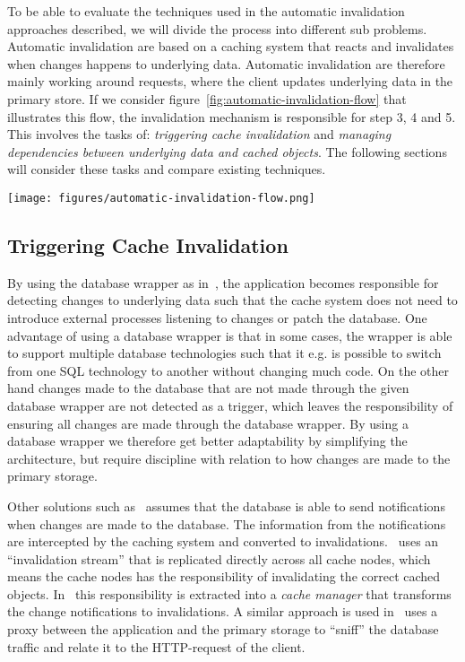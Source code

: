 To be able to evaluate the techniques used in the automatic invalidation approaches described, we will divide the process into different sub problems. Automatic invalidation are based on a caching system that reacts and invalidates when changes happens to underlying data. Automatic invalidation are therefore mainly working around requests, where the client updates underlying data in the primary store. If we consider figure~\ref{fig:automatic-invalidation-flow} that illustrates this flow, the invalidation mechanism is responsible for step 3, 4 and 5. This involves the tasks of: \emph{triggering cache invalidation} and \emph{managing dependencies between underlying data and cached objects}. The following sections will consider these tasks and compare existing techniques.

\begin{figure*}[ht!]
  \centering
  \texttt{[image: figures/automatic-invalidation-flow.png]}
  \caption{The control flow of automatic invalidation when a client requests to update underlying data}
  \label{fig:automatic-invalidation-flow}
\end{figure*}

\subsection{Triggering Cache Invalidation}
\label{subsubsec:triggering-cache-invalidation}

By using the database wrapper as in~\cite{paper:cache-genie, paper:deploy-time}, the application becomes responsible for detecting changes to underlying data such that the cache system does not need to introduce external processes listening to changes or patch the database. One advantage of using a database wrapper is that in some cases, the wrapper is able to support multiple database technologies such that it e.g. is possible to switch from one SQL technology to another without changing much code. On the other hand changes made to the database that are not made through the given database wrapper are not detected as a trigger, which leaves the responsibility of ensuring all changes are made through the database wrapper. By using a database wrapper we therefore get better adaptability by simplifying the architecture, but require discipline with relation to how changes are made to the primary storage.

Other solutions such as~\cite{paper:liskov, paper:ibm, paper:ibm-extended} assumes that the database is able to send notifications when changes are made to the database. The information from the notifications are intercepted by the caching system and converted to invalidations.~\cite{paper:liskov} uses an ``invalidation stream'' that is replicated directly across all cache nodes, which means the cache nodes has the responsibility of invalidating the correct cached objects. In~\cite{paper:ibm, paper:ibm-extended} this responsibility is extracted into a \emph{cache manager} that transforms the change notifications to invalidations. A similar approach is used in~\cite{paper:db-driven-http} uses a proxy between the application and the primary storage to ``sniff'' the database traffic and relate it to the HTTP-request of the client.

